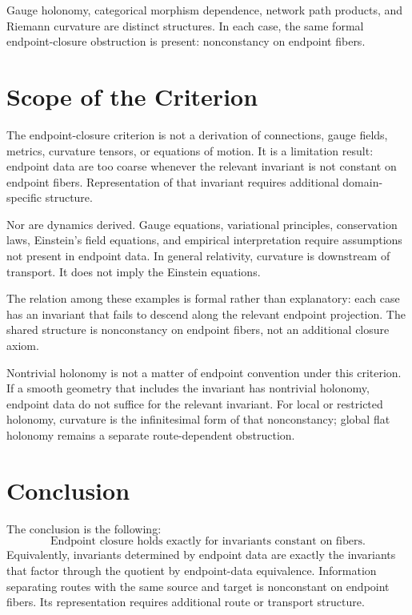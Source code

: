 \documentclass[12pt]{article}
\begin{document}
Gauge holonomy, categorical morphism dependence, network path products,
and Riemann curvature are distinct structures. In each case, the same
formal endpoint-closure obstruction is present: nonconstancy on endpoint
fibers.

\section{Scope of the Criterion}
\label{sec:scope}

The endpoint-closure criterion is not a derivation of connections,
gauge fields, metrics, curvature tensors, or equations of motion. It is
a limitation result: endpoint data are too coarse whenever the relevant
invariant is not constant on endpoint fibers. Representation of that
invariant requires additional domain-specific structure.

Nor are dynamics derived. Gauge equations, variational
principles, conservation laws, Einstein's field equations, and empirical
interpretation require assumptions not present in endpoint data.
In general relativity, curvature is downstream of transport. It does not
imply the Einstein equations.

The relation among these examples is formal rather than explanatory:
each case has an invariant that fails to descend along the relevant
endpoint projection. The shared structure is nonconstancy on endpoint
fibers, not an additional closure axiom.

Nontrivial holonomy is not a matter of endpoint convention under this
criterion. If a smooth geometry that includes the invariant has
nontrivial holonomy, endpoint data do not suffice for the relevant
invariant. For local or restricted holonomy, curvature is the
infinitesimal form of that nonconstancy; global flat holonomy remains a
separate route-dependent obstruction.

\section{Conclusion}
\label{sec:conclusion}

The conclusion is the following:
\[
\boxed{\text{Endpoint closure holds exactly for invariants constant on fibers.}}
\]
Equivalently, invariants determined by endpoint data are exactly the
invariants that factor through the quotient by endpoint-data equivalence.
Information separating routes with the same source and target is
nonconstant on endpoint fibers. Its representation requires additional
route or transport structure.
\end{document}
